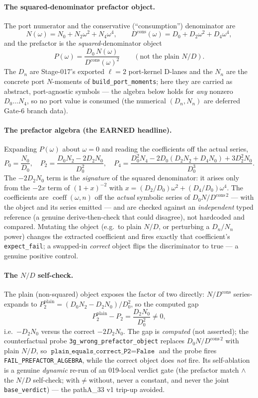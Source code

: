 \paragraph{The squared-denominator prefactor object.}
The port numerator and the conservative (``consumption'') denominator are
\[
  N(\omega)=N_0+N_2\omega^2+N_4\omega^4,
  \qquad
  D^{\mathrm{cons}}(\omega)=D_0+D_2\omega^2+D_4\omega^4,
\]
and the prefactor is the \emph{squared}-denominator object
\[
  P(\omega)=\frac{D_0\,N(\omega)}{D^{\mathrm{cons}}(\omega)^2}
  \qquad(\text{not the plain } N/D).
\]
The \(D_n\) are Stage-017's exported \(\ell=2\) port-kernel D-lanes and the \(N_n\) are the
concrete port \(N\)-moments of \texttt{build\_port\_moments}; here they are carried as
abstract, port-agnostic symbols --- the algebra below holds for \emph{any} nonzero
\(D_0\ldots N_4\), so no port value is consumed (the numerical \((D_n,N_n)\) are deferred
Gate-6 branch data).

\paragraph{The prefactor algebra (the EARNED headline).}
Expanding \(P(\omega)\) about \(\omega=0\) and reading the coefficients off the actual series,
\[
  P_0=\frac{N_0}{D_0},\quad
  P_2=\frac{D_0N_2-2D_2N_0}{D_0^2},\quad
  P_4=\frac{D_0^2N_4-2D_0(D_2N_2+D_4N_0)+3D_2^2N_0}{D_0^3}.
\]
The \(-2D_2N_0\) term is the \emph{signature} of the squared denominator: it arises only from
the \(-2x\) term of \((1+x)^{-2}\) with \(x=(D_2/D_0)\omega^2+(D_4/D_0)\omega^4\). The
coefficients are \(\operatorname{coeff}(\omega,n)\) off the \emph{actual} symbolic series of
\(D_0N/D^{\mathrm{cons}\,2}\) --- with the object and its series emitted --- and are checked
against an \emph{independent} typed reference (a genuine derive-then-check that could
disagree), not hardcoded and compared. Mutating the object (e.g.\ to plain \(N/D\), or
perturbing a \(D_n/N_n\) power) changes the extracted coefficient and fires exactly that
coefficient's \texttt{expect\_fail}; a swapped-in \emph{correct} object flips the
discriminator to true --- a genuine positive control.

\paragraph{The \texorpdfstring{\(N/D\)}{N/D} self-check.}
The plain (non-squared) object exposes the factor of two directly: \(N/D^{\mathrm{cons}}\)
series-expands to \(P_2^{\mathrm{plain}}=(D_0N_2-D_2N_0)/D_0^2\), so the computed gap
\[
  P_2^{\mathrm{plain}}-P_2=\frac{D_2N_0}{D_0^2}\ne0,
\]
i.e.\ \(-D_2N_0\) versus the correct \(-2D_2N_0\). The gap is \emph{computed} (not asserted);
the counterfactual probe \texttt{3g\_wrong\_prefactor\_object} replaces \(D_0N/D^{\mathrm{cons}\,2}\)
with plain \(N/D\), so \(\texttt{plain\_equals\_correct\_P2}=\texttt{False}\) and the probe fires
\texttt{FAIL\_PREFACTOR\_ALGEBRA}, while the correct object does \emph{not} fire. Its
self-ablation is a genuine \emph{dynamic} re-run of an 019-local verdict gate (the prefactor
match \(\wedge\) the \(N/D\) self-check; \(\mathrm{with}\ne\mathrm{without}\), never a
constant, and never the joint \texttt{base\_verdict}) --- the pathA\_33 v1 trip-up avoided.

